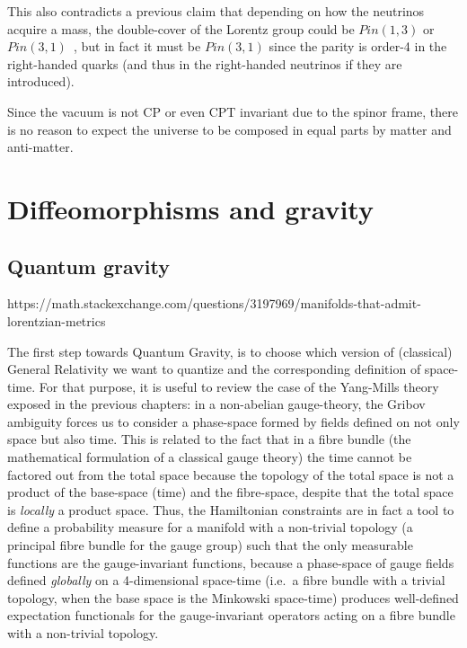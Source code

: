 \documentclass[11pt]{book}
\begin{document}
This also contradicts a previous claim that depending on how the
neutrinos acquire a mass, the double-cover of the Lorentz group could be
\(Pin(1,3)\) or \(Pin(3,1)\)~\cite{Berg2001Pin}, but in fact it must be \(Pin(3,1)\) since the parity is
order-4 in the right-handed quarks (and thus in the right-handed
neutrinos if they are introduced).

Since the vacuum is not CP or even CPT invariant due to the spinor
frame, there is no reason to expect the universe to be composed in equal
parts by matter and anti-matter.

\chapter{Diffeomorphisms and gravity}
\hypertarget{quantum-gravity}{%
\section{Quantum gravity}\label{quantum-gravity}}

https://math.stackexchange.com/questions/3197969/manifolds-that-admit-lorentzian-metrics

\cite{Farrah_2023}

The first step towards Quantum Gravity, is to choose which version of
(classical) General Relativity we want to quantize and the corresponding
definition of space-time. For that purpose, it is useful to review the
case of the Yang-Mills theory exposed in the previous chapters: in a
non-abelian gauge-theory, the Gribov ambiguity forces us to consider a
phase-space formed by fields defined on not only space but also time.
This is related to the fact that in a fibre bundle (the mathematical
formulation of a classical gauge theory) the time cannot be factored out
from the total space because the topology of the total space is not a
product of the base-space (time) and the fibre-space, despite that the
total space is \emph{locally} a product space. Thus, the Hamiltonian
constraints are in fact a tool to define a probability measure for a
manifold with a non-trivial topology (a principal fibre bundle for the
gauge group) such that the only measurable functions are the
gauge-invariant
functions\cite{Franuxe7ois2014Gauge}, because a phase-space of gauge fields defined
\emph{globally} on a 4-dimensional space-time (i.e.~a fibre bundle with
a trivial topology, when the base space is the Minkowski space-time)
produces well-defined expectation functionals for the gauge-invariant
operators acting on a fibre bundle with a non-trivial
topology\cite{Franuxe7ois2014Gauge}.
\end{document}
